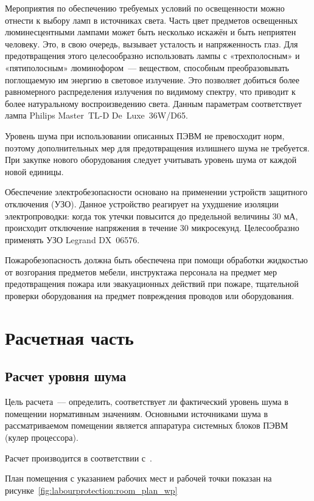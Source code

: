 Мероприятия по обеспечению требуемых условий по освещенности можно отнести к выбору ламп в источниках света. Часть цвет предметов освещенных люминесцентными лампами может быть несколько искажён и быть неприятен человеку. Это, в свою очередь, вызывает усталость и напряженность глаз. Для предотвращения этого целесообразно использовать лампы с «трехполосным» и «пятиполосным» люминофором~--- веществом, способным преобразовывать поглощаемую им энергию в световое излучение. Это позволяет добиться более равномерного распределения излучения по видимому спектру, что приводит к более натуральному воспроизведению света. Данным параметрам соответствует лампа Philips Master~TL-D De~Luxe~36W/D65.

Уровень шума при использовании описанных ПЭВМ не превосходит норм, поэтому дополнительных мер для предотвращения излишнего шума не требуется. При закупке нового оборудования следует учитывать уровень шума от каждой новой единицы.

Обеспечение электробезопасности основано на применении устройств защитного отключения (УЗО). Данное устройство реагирует на ухудшение изоляции электропроводки: когда ток утечки повысится до предельной величины 30 мА, происходит отключение напряжения в течение 30 микросекунд. Целесообразно применять УЗО Legrand DX~06576.

Пожаробезопасность должна быть обеспечена при помощи обработки жидкостью от возгорания предметов мебели, инструктажа персонала на предмет мер предотвращения пожара или эвакуационных действий при пожаре, тщательной проверки оборудования на предмет повреждения проводов или оборудования.

\section{Расчетная часть}\label{sec:labourprotection:calc}
\subsection{Расчет уровня шума}
Цель расчета~–-- определить, соответствует ли фактический уровень шума в помещении нормативным значениям. Основными источниками шума в рассматриваемом помещении является аппаратура системных блоков ПЭВМ (кулер процессора).

Расчет производится в соответствии с~\cite{LabourProtOnCC}.

План помещения с указанием рабочих мест и рабочей точки показан на рисунке~\ref{fig:labourprotection:room_plan_wp}

